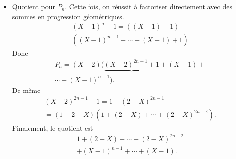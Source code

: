 \begin{itemize}
  \item Quotient pour $P_n$.\newline
Cette fois, on réussit à factoriser directement avec des sommes en progression géométriques.
\begin{multline*}
  (X-1)^n - 1 =   \left((X -1) - 1 \right) \\ 
  \left( (X-1)^{n-1} +  \cdots + (X-1) + 1\right)
\end{multline*}
Donc
\begin{multline*}
  P_n = (X-2)( \underbrace{(X-2)^{2n-1} +1} + (X-1) + \\
  \cdots + (X-1)^{n-1}).
\end{multline*}
De même
\begin{multline*}
  (X-2)^{2n-1} +1 = 1 - (2-X)^{2n-1} \\
  = (1-2 + X)\left(1 + (2-X) + \cdots +(2-X)^{2n-2}\right).
\end{multline*}
Finalement, le quotient est
\begin{multline*}
  1 + (2-X) + \cdots +(2-X)^{2n-2} \\
  + (X-1)^{n-1} +  \cdots + (X-1) .
\end{multline*}

\end{itemize}


